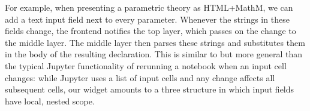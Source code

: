 For example, when presenting a parametric theory as HTML+MathM, we can add a text input field next to every parameter.
Whenever the strings in these fields change, the frontend notifies the top layer, which passes on the change to the middle layer.
The middle layer then parses these strings and substitutes them in the body of the resulting declaration.
This is similar to but more general than the typical Jupyter functionality of rerunning a notebook when an input cell changes: while Jupyter uses a list of input cells and any change affects all subsequent cells, our widget amounts to a three structure in which input fields have local, nested scope.


